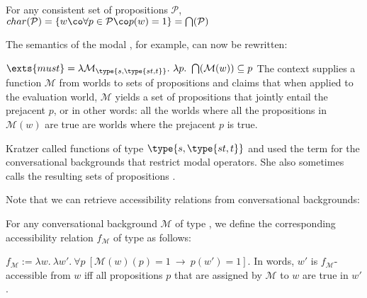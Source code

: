 \ex For any consistent set of propositions $\mathcal{P}$,\\
\(char({\mathcal{P}}) = \{w\co \forall p\in\mathcal{P}\co p(w)=1\} =
\bigcap(\mathcal{P})\) \xe

The semantics of the modal , for example, can now be rewritten:

\ex \(\exts{must} = \lambda \mathcal{M}_{\type{s,\type{st,t}}}.\ \lambda
p.\ \bigcap(\mathcal{M}(w)) \subseteq p\) \xe
%
%
The context supplies a function $\mathcal{M}$ from worlds to sets of
propositions and  claims that when applied to the evaluation
world, $\mathcal{M}$ yields a set of propositions that jointly entail the
prejacent $p$, or in other words: all the worlds where all the propositions in
$\mathcal{M}(w)$ are true are worlds where the prejacent $p$ is true.

Kratzer called functions of type $\type{s,\type{st,t}}$
 and used the term  for the
conversational backgrounds that restrict modal operators. She also sometimes
calls the resulting sets of propositions .

\kwn
Note that we can retrieve accessibility relations from conversational
backgrounds:

\ex \label{convers}For any conversational background $\mathcal{M}$ of type
, we define the corresponding accessibility relation $f_{\mathcal{M}}$
of type  as follows:

$f_{\mathcal{M}} := \lambda w.\ \lambda w'.\ \forall p\ [ \mathcal{M}(w)(p)=1\ \rightarrow\ p(w')=1
]$. \xe
%
In words, $w'$ is $f_{\mathcal{M}}$-accessible from $w$ iff all propositions $p$
that are assigned by $\mathcal{M}$ to $w$ are true in $w'$.

